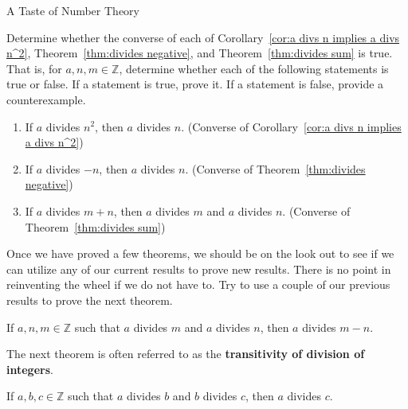 \begin{section}{A Taste of Number Theory}
\begin{problem}
Determine whether the converse of each of Corollary~\ref{cor:a divs n implies a divs n^2}, Theorem~\ref{thm:divides negative}, and Theorem~\ref{thm:divides sum} is true.  That is, for $a,n,m\in\mathbb{Z}$, determine whether each of the following statements is true or false. If a statement is true, prove it. If a statement is false, provide a counterexample.
\begin{enumerate}[label=\textrm{(\alph*)}]
\item If $a$ divides $n^2$, then $a$ divides $n$. (Converse of Corollary~\ref{cor:a divs n implies a divs n^2})
\item If $a$ divides $-n$, then $a$ divides $n$. (Converse of Theorem~\ref{thm:divides negative})
\item If $a$ divides $m+n$, then $a$ divides $m$ and $a$ divides $n$. (Converse of Theorem~\ref{thm:divides sum})
\end{enumerate}
\end{problem}

Once we have proved a few theorems, we should be on the look out to see if we can utilize any of our current results to prove new results.  There is no point in reinventing the wheel if we do not have to.  Try to use a couple of our previous results to prove the next theorem.

\begin{theorem}
If $a,n,m\in\mathbb{Z}$ such that $a$ divides $m$ and $a$ divides $n$, then $a$ divides $m-n$.
\end{theorem}

The next theorem is often referred to as the \textbf{transitivity of division of integers}.

\begin{theorem}\label{thm:transitivity of divides}
If $a,b,c\in\mathbb{Z}$ such that $a$ divides $b$ and $b$ divides $c$, then $a$ divides $c$.
\end{theorem}

\end{section}